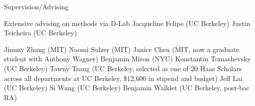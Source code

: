 \begin{rubric}{Supervision/Advising}

\entry* Extensive advising on methods via D-Lab
\entry* Jacqueline Felipe (UC Berkeley)
\entry* Justin Teicheira (UC Berkeley)

\entry* Jimmy Zhang (MIT)
\entry* Naomi Sulzer (MIT)
\entry* Janice Chen (MIT, now a graduate student with Anthony Wagner)
\entry* Benjamin Miron (NYU)
\entry* Konstantin Tomashevsky (UC Berkeley)
\entry* \hangindent=0.7cm Tawny Tsang (UC Berkeley, selected as one of 20 Haas Scholars across all departments at UC
Berkeley, \$12,600 in stipend and budget)
\entry* Jeff Lai (UC Berkeley)
\entry* Si Wang (UC Berkeley)
\entry* Benjamin Walklet (UC Berkeley, post-bac RA)

\end{rubric}
